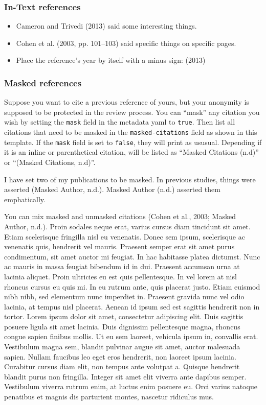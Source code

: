 \documentclass[
  man,
  floatsintext,
  longtable,
  nolmodern,
  notxfonts,
  notimes,
  mask,
  colorlinks=true,linkcolor=blue,citecolor=blue,urlcolor=blue]{apa7}
\begin{document}
\subsubsection{In-Text references}\label{in-text-references}

\begin{itemize}
\item
  Cameron and Trivedi (2013) said some interesting things.
\item
  Cohen et al. (2003, pp. 101--103) said specific things on specific
  pages.
\item
  Place the reference's year by itself with a minus sign: (2013)
\end{itemize}

\subsubsection{Masked references}\label{masked-references}

Suppose you want to cite a previous reference of yours, but your
anonymity is supposed to be protected in the review process. You can
``mask'' any citation you wish by setting the \texttt{mask} field in the
metadata yaml to \texttt{true}. Then list all citations that need to be
masked in the \texttt{masked-citations} field as shown in this template.
If the \texttt{mask} field is set to \texttt{false}, they will print as
ususual. Depending if it is an inline or parenthetical citation, will be
listed as ``Masked Citations (n.d)'' or ``(Masked Citations, n.d)''.

I have set two of my publications to be masked. In previous studies,
things were asserted (Masked Author, n.d.). Masked Author (n.d.)
asserted them emphatically.

You can mix masked and unmasked citations (Cohen et al., 2003; Masked
Author, n.d.). Proin sodales neque erat, varius cursus diam tincidunt
sit amet. Etiam scelerisque fringilla nisl eu venenatis. Donec sem
ipsum, scelerisque ac venenatis quis, hendrerit vel mauris. Praesent
semper erat sit amet purus condimentum, sit amet auctor mi feugiat. In
hac habitasse platea dictumst. Nunc ac mauris in massa feugiat bibendum
id in dui. Praesent accumsan urna at lacinia aliquet. Proin ultricies eu
est quis pellentesque. In vel lorem at nisl rhoncus cursus eu quis mi.
In eu rutrum ante, quis placerat justo. Etiam euismod nibh nibh, sed
elementum nunc imperdiet in. Praesent gravida nunc vel odio lacinia, at
tempus nisl placerat. Aenean id ipsum sed est sagittis hendrerit non in
tortor. Lorem ipsum dolor sit amet, consectetur adipiscing elit. Duis
sagittis posuere ligula sit amet lacinia. Duis dignissim pellentesque
magna, rhoncus congue sapien finibus mollis. Ut eu sem laoreet, vehicula
ipsum in, convallis erat. Vestibulum magna sem, blandit pulvinar augue
sit amet, auctor malesuada sapien. Nullam faucibus leo eget eros
hendrerit, non laoreet ipsum lacinia. Curabitur cursus diam elit, non
tempus ante volutpat a. Quisque hendrerit blandit purus non fringilla.
Integer sit amet elit viverra ante dapibus semper. Vestibulum viverra
rutrum enim, at luctus enim posuere eu. Orci varius natoque penatibus et
magnis dis parturient montes, nascetur ridiculus mus.
\end{document}
